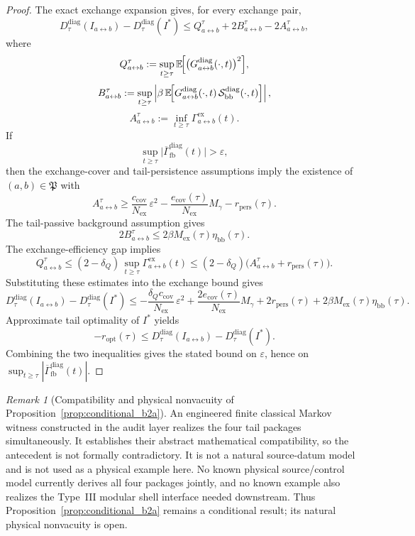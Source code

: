 \documentclass[12pt]{article}
\theoremstyle{definition}
\theoremstyle{remark}
\newtheorem{remark}[theorem]{Remark}
\begin{document}
\begin{proof}
The exact exchange expansion gives, for every exchange pair,
\[
D_\tau^{\mathrm{diag}}(I_{a\leftrightarrow b})
-
D_\tau^{\mathrm{diag}}(I^*)
\le
Q_{a\leftrightarrow b}^\tau
+
2B_{a\leftrightarrow b}^\tau
-
2A_{a\leftrightarrow b}^\tau,
\]
where
\[
Q_{a\leftrightarrow b}^\tau
:=
\sup_{t\ge\tau}
\mathbb E\!\Bigl[
\bigl(G_{a\leftrightarrow b}^{\mathrm{diag}}(\cdot,t)\bigr)^2
\Bigr],
\]
\[
B_{a\leftrightarrow b}^\tau
:=
\sup_{t\ge\tau}
\left|
\beta\,
\mathbb E\!\Bigl[
G_{a\leftrightarrow b}^{\mathrm{diag}}(\cdot,t)\,
\mathcal S_{\mathrm{bb}}^{\mathrm{diag}}(\cdot,t)
\Bigr]
\right|,
\]
\[
A_{a\leftrightarrow b}^\tau
:=
\inf_{t\ge\tau}
\Gamma_{a\leftrightarrow b}^{\mathrm{ex}}(t).
\]
If
\[
\sup_{t\ge\tau}
\bigl|
\overline{\Gamma}_{\mathrm{fb}}^{\mathrm{diag}}(t)
\bigr|
>
\varepsilon,
\]
then the exchange-cover and tail-persistence assumptions imply the
existence of \((a,b)\in\mathfrak P\) with
\[
A_{a\leftrightarrow b}^\tau
\ge
\frac{c_{\mathrm{cov}}}{N_{\mathrm{ex}}}\,\varepsilon^2
-
\frac{e_{\mathrm{cov}}(\tau)}{N_{\mathrm{ex}}}M_\gamma
-
r_{\mathrm{pers}}(\tau).
\]
The tail-passive background assumption gives
\[
2B_{a\leftrightarrow b}^\tau
\le
2\beta M_{\mathrm{ex}}(\tau)\eta_{\mathrm{bb}}(\tau).
\]
The exchange-efficiency gap implies
\[
Q_{a\leftrightarrow b}^\tau
\le
(2-\delta_Q)\,
\sup_{t\ge\tau}\Gamma_{a\leftrightarrow b}^{\mathrm{ex}}(t)
\le
(2-\delta_Q)\bigl(
A_{a\leftrightarrow b}^\tau+r_{\mathrm{pers}}(\tau)
\bigr).
\]
Substituting these estimates into the exchange bound gives
\[
D_\tau^{\mathrm{diag}}(I_{a\leftrightarrow b})
-
D_\tau^{\mathrm{diag}}(I^*)
\le
-
\frac{\delta_Q c_{\mathrm{cov}}}{N_{\mathrm{ex}}}\,\varepsilon^2
+
\frac{2e_{\mathrm{cov}}(\tau)}{N_{\mathrm{ex}}}M_\gamma
+
2r_{\mathrm{pers}}(\tau)
+
2\beta M_{\mathrm{ex}}(\tau)\eta_{\mathrm{bb}}(\tau).
\]
Approximate tail optimality of \(I^*\) yields
\[
-r_{\mathrm{opt}}(\tau)
\le
D_\tau^{\mathrm{diag}}(I_{a\leftrightarrow b})
-
D_\tau^{\mathrm{diag}}(I^*).
\]
Combining the two inequalities gives the stated bound on
\(\varepsilon\), hence on
\(\sup_{t\ge\tau}|\overline{\Gamma}_{\mathrm{fb}}^{\mathrm{diag}}(t)|\).
\end{proof}

\begin{remark}[Compatibility and physical nonvacuity of
Proposition~\ref{prop:conditional_b2a}]
An engineered finite classical Markov witness constructed in the audit
layer realizes the four tail packages simultaneously. It establishes
their abstract mathematical compatibility, so the antecedent is not
formally contradictory. It is not a natural source-datum model and is
not used as a physical example here. No known physical source/control
model currently derives all four packages jointly, and no known example
also realizes the Type~III modular shell interface needed downstream.
Thus Proposition~\ref{prop:conditional_b2a} remains a conditional result;
its natural physical nonvacuity is open.
\end{remark}
\end{document}
